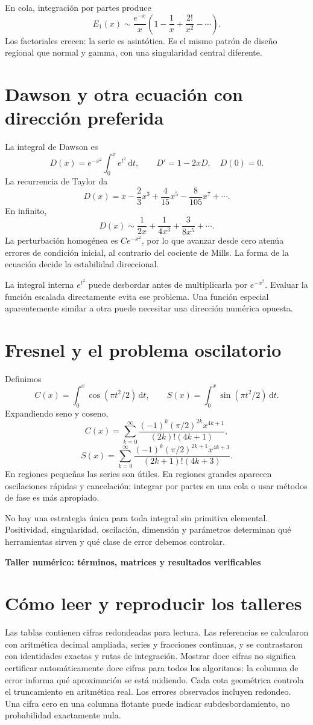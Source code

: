 \documentclass[11pt,a4paper]{article}
\newcommand{\dd}{\,\mathrm d}
\theoremstyle{definition}
\newcommand{\parte}[1]{\par\bigskip\Needspace{8\baselineskip}\begin{center}{\Large\bfseries\color{azul}#1}\end{center}}
\newcounter{problema}
\begin{document}
En cola, integración por partes produce
\[
E_1(x)\sim\frac{e^{-x}}x
\left(1-\frac1x+\frac{2!}{x^2}-\cdots\right).
\]
Los factoriales crecen: la serie es asintótica. Es el mismo patrón de diseño regional que normal y gamma, con una singularidad central diferente.

\section{Dawson y otra ecuación con dirección preferida}
La integral de Dawson es
\[
D(x)=e^{-x^2}\int_0^xe^{t^2}\dd t,\qquad D'=1-2xD,\quad D(0)=0.
\]
La recurrencia de Taylor da
\[
D(x)=x-\frac23x^3+\frac4{15}x^5-\frac8{105}x^7+\cdots.
\]
En infinito,
\[
D(x)\sim\frac1{2x}+\frac1{4x^3}+\frac3{8x^5}+\cdots.
\]
La perturbación homogénea es $Ce^{-x^2}$, por lo que avanzar desde cero atenúa errores de condición inicial, al contrario del cociente de Mills. La forma de la ecuación decide la estabilidad direccional.

La integral interna $e^{t^2}$ puede desbordar antes de multiplicarla por $e^{-x^2}$. Evaluar la función escalada directamente evita ese problema. Una función especial aparentemente similar a otra puede necesitar una dirección numérica opuesta.

\section{Fresnel y el problema oscilatorio}
Definimos
\[
C(x)=\int_0^x\cos(\pi t^2/2)\dd t,\qquad
S(x)=\int_0^x\sin(\pi t^2/2)\dd t.
\]
Expandiendo seno y coseno,
\[
C(x)=\sum_{k=0}^\infty
\frac{(-1)^k(\pi/2)^{2k}x^{4k+1}}{(2k)!(4k+1)},
\]
\[
S(x)=\sum_{k=0}^\infty
\frac{(-1)^k(\pi/2)^{2k+1}x^{4k+3}}{(2k+1)!(4k+3)}.
\]
En regiones pequeñas las series son útiles. En regiones grandes aparecen oscilaciones rápidas y cancelación; integrar por partes en una cola o usar métodos de fase es más apropiado.

No hay una estrategia única para toda integral sin primitiva elemental. Positividad, singularidad, oscilación, dimensión y parámetros determinan qué herramientas sirven y qué clase de error debemos controlar.



\parte{Taller numérico: términos, matrices y resultados verificables}
\section{Cómo leer y reproducir los talleres}
Las tablas contienen cifras redondeadas para lectura. Las referencias se calcularon con aritmética decimal ampliada, series y fracciones continuas, y se contrastaron con identidades exactas y rutas de integración. Mostrar doce cifras no significa certificar automáticamente doce cifras para todos los algoritmos: la columna de error informa qué aproximación se está midiendo.
Cada cota geométrica controla el truncamiento en aritmética real. Los errores observados incluyen redondeo. Una cifra cero en una columna flotante puede indicar subdesbordamiento, no probabilidad exactamente nula.
\end{document}

